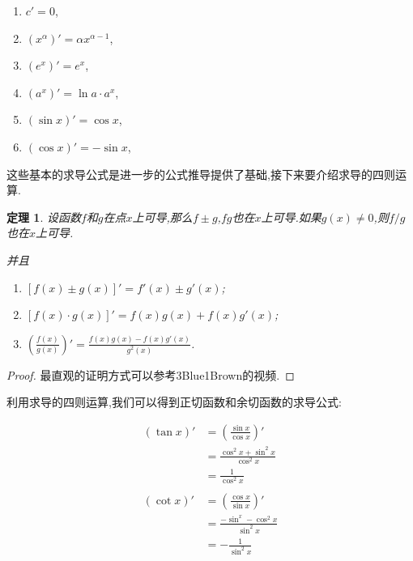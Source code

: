 \documentclass{article}
\newtheorem{theorem}{定理}[subsection]
\begin{document}
\begin{enumerate}
    \item $c'=0$,
    \item $(x^{\alpha})'=\alpha x^{\alpha-1}$,
    \item $(e^x)'=e^x$,
    \item $(a^x)'=\ln a \cdot a^x$,
    \item $(\sin x)'=\cos x$,
    \item $(\cos x)'=-\sin x$,\\
\end{enumerate}

\noindent 这些基本的求导公式是进一步的公式推导提供了基础,接下来要介绍求导的四则运算.\\

\begin{theorem}
    设函数$f$和$g$在点$x$上可导,那么$f\pm g$,$fg$也在$x$上可导.如果$g(x)\neq 0$,则$f/g$也在$x$上可导.

    并且
    \begin{enumerate}
        \item $[f(x)\pm g(x)]'=f'(x)\pm g'(x)$;
        \item $[f(x)\cdot g(x)]'=f(x)g(x)+f(x)g'(x)$;
        \item $(\frac{f(x)}{g(x)})'=\frac{f(x)g(x)-f(x)g'(x)}{g^2(x)}$.
    \end{enumerate}
\end{theorem}

\begin{proof}
    \noindent 最直观的证明方式可以参考3Blue1Brown的视频.
\end{proof}

\newpage

\noindent 利用求导的四则运算,我们可以得到正切函数和余切函数的求导公式:

\begin{align*}
    (\tan x)'&=(\frac{\sin x}{\cos x})'\\
    &=\frac{\cos^2 x+\sin^2 x}{\cos^2 x}\\
    &=\frac{1}{\cos^2 x}\\
    \\
    (\cot x)'&=(\frac{\cos x}{\sin x})'\\
    &=\frac{-\sin^ x - \cos^2 x}{\sin^2 x}\\
    &=-\frac{1}{\sin^2 x}\\
\end{align*}
\end{document}
